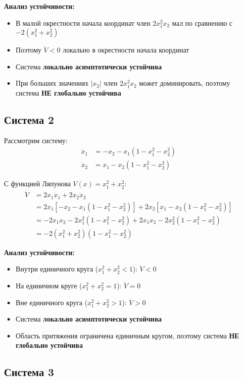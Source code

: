 \textbf{Анализ устойчивости:}
\begin{itemize}
\item В малой окрестности начала координат член $2x_1^2 x_2$ мал по сравнению с $-2(x_1^2 + x_2^2)$
\item Поэтому $\dot{V} < 0$ локально в окрестности начала координат
\item Система \textbf{локально асимптотически устойчива}
\item При больших значениях $|x_2|$ член $2x_1^2 x_2$ может доминировать, поэтому система \textbf{НЕ глобально устойчива}
\end{itemize}

\subsection*{Система 2}

Рассмотрим систему:
\begin{align}
\dot{x}_1 &= -x_2 - x_1(1 - x_1^2 - x_2^2) \\
\dot{x}_2 &= x_1 - x_2(1 - x_1^2 - x_2^2)
\end{align}

С функцией Ляпунова $V(x) = x_1^2 + x_2^2$:
\begin{align}
\dot{V} &= 2x_1 \dot{x}_1 + 2x_2 \dot{x}_2 \\
&= 2x_1[-x_2 - x_1(1 - x_1^2 - x_2^2)] + 2x_2[x_1 - x_2(1 - x_1^2 - x_2^2)] \\
&= -2x_1 x_2 - 2x_1^2(1 - x_1^2 - x_2^2) + 2x_1 x_2 - 2x_2^2(1 - x_1^2 - x_2^2) \\
&= -2(x_1^2 + x_2^2)(1 - x_1^2 - x_2^2)
\end{align}

\textbf{Анализ устойчивости:}
\begin{itemize}
\item Внутри единичного круга ($x_1^2 + x_2^2 < 1$): $\dot{V} < 0$
\item На единичном круге ($x_1^2 + x_2^2 = 1$): $\dot{V} = 0$
\item Вне единичного круга ($x_1^2 + x_2^2 > 1$): $\dot{V} > 0$
\item Система \textbf{локально асимптотически устойчива}
\item Область притяжения ограничена единичным кругом, поэтому система \textbf{НЕ глобально устойчива}
\end{itemize}

\subsection*{Система 3}

